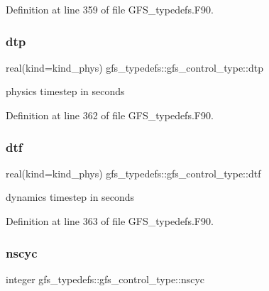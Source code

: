 Definition at line 359 of file G\+F\+S\+\_\+typedefs.\+F90.

\mbox{\label{structgfs__typedefs_1_1gfs__control__type_a59a729aa0c8d53dab8d9c0dc0bb4585f}} 
\subsubsection{dtp}
{\footnotesize\ttfamily real(kind=kind\+\_\+phys) gfs\+\_\+typedefs\+::gfs\+\_\+control\+\_\+type\+::dtp}



physics timestep in seconds 



Definition at line 362 of file G\+F\+S\+\_\+typedefs.\+F90.

\mbox{\label{structgfs__typedefs_1_1gfs__control__type_a89acdd50ae5f1f0a48444ef6a13ffce5}} 
\subsubsection{dtf}
{\footnotesize\ttfamily real(kind=kind\+\_\+phys) gfs\+\_\+typedefs\+::gfs\+\_\+control\+\_\+type\+::dtf}



dynamics timestep in seconds 



Definition at line 363 of file G\+F\+S\+\_\+typedefs.\+F90.

\mbox{\label{structgfs__typedefs_1_1gfs__control__type_a27c132ee413c6e01bd5943cb8847dd77}} 
\subsubsection{nscyc}
{\footnotesize\ttfamily integer gfs\+\_\+typedefs\+::gfs\+\_\+control\+\_\+type\+::nscyc}



